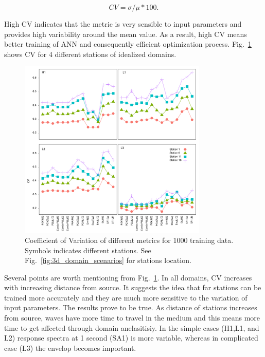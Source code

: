 \begin{equation}
CV=\sigma/\mu * 100. 
\end{equation}

High CV indicates that the metric is very sensible to input parameters and provides high variability around the mean value. As a result, high CV means better training of ANN and consequently efficient optimization process. Fig.~\ref{fig:metrics_sensitivity} shows CV for 4 different stations of idealized domains. 

  \begin{figure}[ht]
    \centering
    \includegraphics[width=0.8\textwidth]{figures/pdf/Figure_13.pdf}
    \caption{Coefficient of Variation of different metrics for 1000 training data. Symbols indicates different stations. See Fig.~\ref{fig:3d_domain_scenarios} for stations location.}
    \label{fig:metrics_sensitivity}
\end{figure}


Several points are worth mentioning from Fig.~\ref{fig:metrics_sensitivity}. In all domains, CV increases with increasing distance from source. It suggests the idea that far stations can be trained more accurately and they are much more sensitive to the variation of input parameters. The results prove to be true. As distance of stations increases from source, waves have more time to travel in the medium and this means more time to get affected through domain anelasitisiy. In the simple cases (H1,L1, and L2) response spectra at 1 second (SA1) is more variable, whereas in complicated case (L3) the envelop becomes important. 







